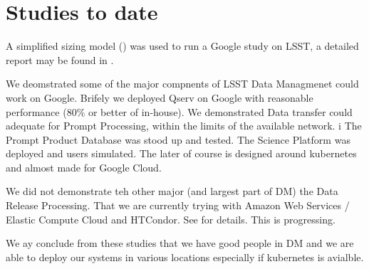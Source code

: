 \section{Studies to date}
A simplified sizing model () was used to run a Google study on \gls{LSST}, a detailed
report may be found in .

We deomstrated some of the major compnents of \gls{LSST} Data Managmenet could work on Google.
Brifely we deployed \gls{Qserv} on Google with reasonable performance (80\% or better of in-house).
We demonstrated Data transfer  could adequate for \gls{Prompt Processing}, within the limits of the available network. i
The Prompt Product Database was  stood up and tested.  The  \gls{Science Platform} was deployed and users simulated.
The later of course is designed around kubernetes and almost made for Google Cloud.


We did not demonstrate teh other major (and largest part of \gls{DM}) the \gls{Data Release} Processing. That we are
currently trying with
Amazon Web Services / Elastic Compute Cloud and HTCondor.
See  for details.
This is progressing.

We ay conclude from these studies that we have good people in \gls{DM} and
we are able to deploy our systems in various locations especially if kubernetes is avialble.
